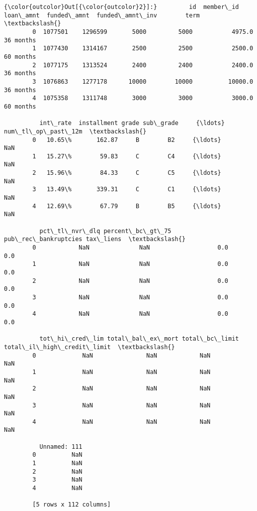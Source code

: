 \documentclass[11pt]{article}
\begin{document}
\begin{Verbatim}[commandchars=\\\{\}]
{\color{outcolor}Out[{\color{outcolor}2}]:}         id  member\_id  loan\_amnt  funded\_amnt  funded\_amnt\_inv        term  \textbackslash{}
        0  1077501    1296599       5000         5000           4975.0   36 months   
        1  1077430    1314167       2500         2500           2500.0   60 months   
        2  1077175    1313524       2400         2400           2400.0   36 months   
        3  1076863    1277178      10000        10000          10000.0   36 months   
        4  1075358    1311748       3000         3000           3000.0   60 months   
        
          int\_rate  installment grade sub\_grade     {\ldots}      num\_tl\_op\_past\_12m  \textbackslash{}
        0   10.65\%       162.87     B        B2     {\ldots}                     NaN   
        1   15.27\%        59.83     C        C4     {\ldots}                     NaN   
        2   15.96\%        84.33     C        C5     {\ldots}                     NaN   
        3   13.49\%       339.31     C        C1     {\ldots}                     NaN   
        4   12.69\%        67.79     B        B5     {\ldots}                     NaN   
        
          pct\_tl\_nvr\_dlq percent\_bc\_gt\_75  pub\_rec\_bankruptcies tax\_liens  \textbackslash{}
        0            NaN              NaN                   0.0       0.0   
        1            NaN              NaN                   0.0       0.0   
        2            NaN              NaN                   0.0       0.0   
        3            NaN              NaN                   0.0       0.0   
        4            NaN              NaN                   0.0       0.0   
        
          tot\_hi\_cred\_lim total\_bal\_ex\_mort total\_bc\_limit total\_il\_high\_credit\_limit  \textbackslash{}
        0             NaN               NaN            NaN                        NaN   
        1             NaN               NaN            NaN                        NaN   
        2             NaN               NaN            NaN                        NaN   
        3             NaN               NaN            NaN                        NaN   
        4             NaN               NaN            NaN                        NaN   
        
          Unnamed: 111  
        0          NaN  
        1          NaN  
        2          NaN  
        3          NaN  
        4          NaN  
        
        [5 rows x 112 columns]
\end{Verbatim}
            
\end{document}
